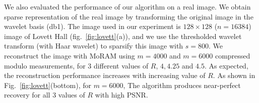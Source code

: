 We also evaluated the performance of our algorithm on a real image. We obtain sparse representation of the real image by transforming the original image in the wavelet basis (db1). The image used in our experiment is $128 \times 128$ ($n=16384$) image of Lovett Hall (fig.~\ref{fig:lovett}(a)), and  we use the thresholded wavelet transform (with Haar wavelet) to sparsify this image with $s = 800$. We reconstruct the image with MoRAM using $m = 4000$ and $m=6000$ compressed modulo measurements, for $3$ different values of $R$, $4,4.25$ and $4.5$. As expected, the reconstruction performance increases with increasing value of $R$. As shown in Fig.~\ref{fig:lovett}(bottom), for $m=6000$, The algorithm produces near-perfect recovery for all $3$ values of $R$ with high PSNR.
%



